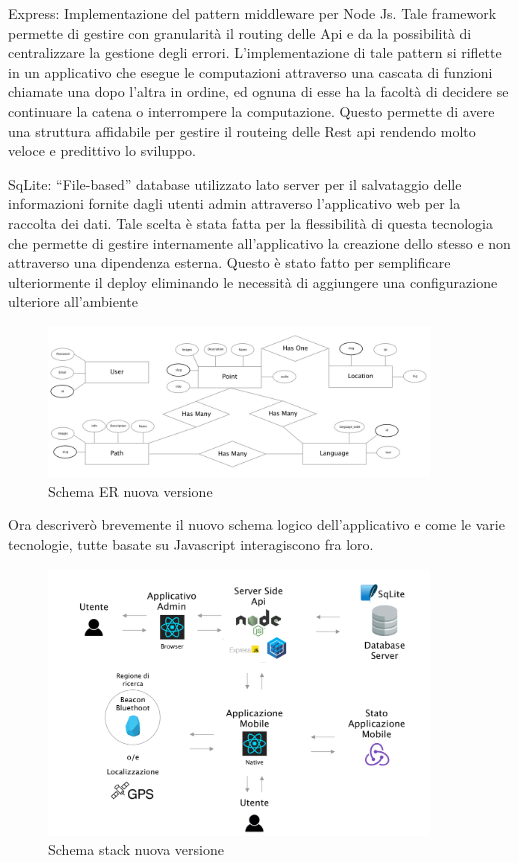 	Express: Implementazione del pattern middleware per Node Js. Tale framework permette di gestire con granularità il routing delle Api e da la possibilità di centralizzare la gestione degli errori. L'implementazione di tale pattern si riflette in un applicativo che esegue le computazioni attraverso una cascata di funzioni chiamate una dopo l'altra in ordine, ed ognuna di esse ha la facoltà di decidere se continuare la catena o interrompere la computazione. Questo permette di avere una struttura affidabile per gestire il routeing delle Rest api rendendo molto veloce e predittivo lo sviluppo.\vspace{5mm}

	SqLite: “File-based” database utilizzato lato server per il salvataggio delle informazioni fornite dagli utenti admin attraverso l’applicativo web per la raccolta dei dati. Tale scelta è stata fatta per la flessibilità di questa tecnologia che permette di gestire internamente all’applicativo la creazione dello stesso e non attraverso una dipendenza esterna. Questo è stato fatto per semplificare ulteriormente il deploy eliminando le necessità di aggiungere una configurazione ulteriore all’ambiente
	
\begin{figure}[h]
\centering
\includegraphics[width=0.9\textwidth]{images/erNew.png}
\caption{Schema ER nuova versione}
\end{figure}

	
	\vspace{5mm}Ora descriverò brevemente il nuovo schema logico dell'applicativo e come le varie tecnologie, tutte basate su Javascript interagiscono fra loro.
	
\begin{figure}[h]
\centering
\includegraphics[width=0.9\textwidth]{images/stackAlakai.png}
\caption{Schema stack nuova versione}
\end{figure}

